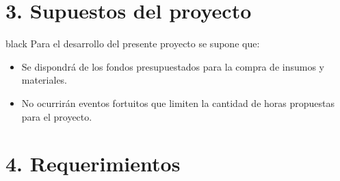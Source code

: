 \documentclass[
11pt, %
codirector, %
]{charter}
\begin{document}
\section{3. Supuestos del proyecto}
\label{sec:supuestos}
\begin{consigna}{black}
Para el desarrollo del presente proyecto se supone que:
\begin{itemize}
	\item Se dispondrá de los fondos presupuestados para la compra de insumos y materiales.
	\item No ocurrirán eventos fortuitos que limiten la cantidad de horas propuestas para el proyecto.
\end{itemize}
\end{consigna}
\section{4. Requerimientos}
\label{sec:requerimientos}
\end{document}

